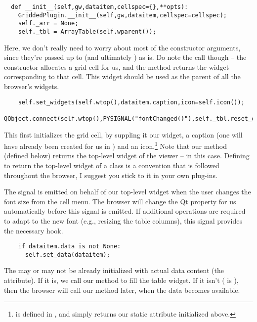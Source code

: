 \documentclass[12pt,twoside]{book}
\begin{document}
\begin{verbatim}  
  def __init__(self,gw,dataitem,cellspec={},**opts):
    GriddedPlugin.__init__(self,gw,dataitem,cellspec=cellspec);
    self._arr = None;
    self._tbl = ArrayTable(self.wparent());
\end{verbatim}

  Here, we don't really need to worry about most of the constructor arguments,
  since they're passed up to  (and ultimately )
  as is. Do note the  call though -- the 
  constructor allocates a grid cell for us, and the  method
  returns the widget corresponding to that cell. This widget should be used as
  the parent  of all the browser's widgets.

\begin{verbatim}  
    self.set_widgets(self.wtop(),dataitem.caption,icon=self.icon());
    QObject.connect(self.wtop(),PYSIGNAL("fontChanged()"),self._tbl.reset_colsizes);
\end{verbatim}

  This first initializes the grid cell, by suppling it our widget, a caption
  (one will have already been created for us in ) and an
  icon.\footnote{ is defined in , and simply
  returns our static  attribute initialized above.} Note that our
   method (defined below) returns the top-level widget of the
  viewer --  in this case. Defining  to return the
  top-level widget of a class is a convention that is followed throughout the
  browser, I suggest you stick to it in your own plug-ins.

  The  signal is emitted on behalf of our top-level widget
  when the user changes the font size from the cell menu. The browser will
  change the Qt  property for us automatically before this signal is
  emitted. If additional operations are required to adapt to the new font (e.g.,
  resizing the table columns), this signal provides the necessary hook.

\begin{verbatim}  
    if dataitem.data is not None:
      self.set_data(dataitem);
\end{verbatim}

  The  may or may not be already initialized with actual data
  content (the  attribute). If it is, we call our 
  method to fill the table widget. If it isn't ( is ), then
  the browser will call our  method later, when the data 
  becomes available.
        
\end{document}
